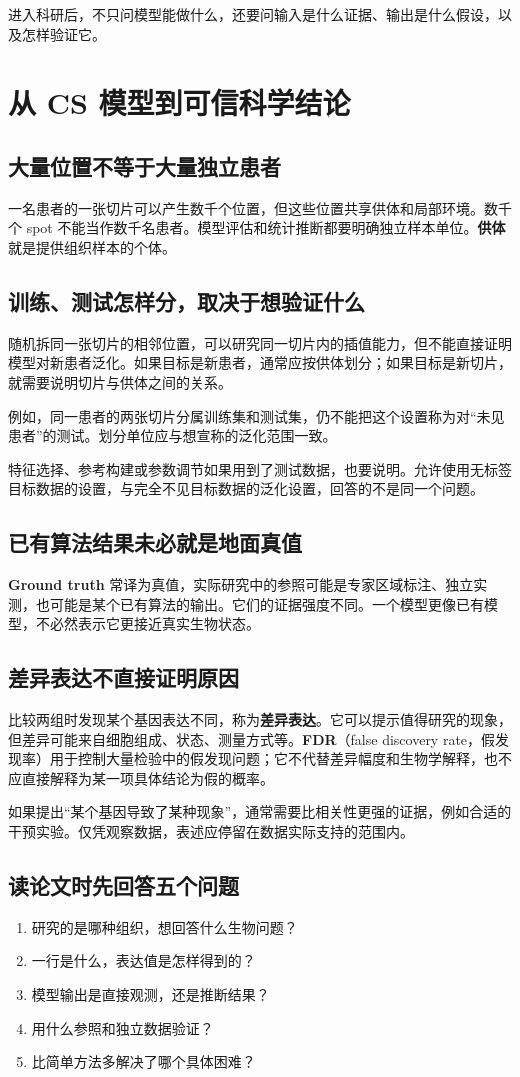 \documentclass[UTF8,a4paper,11pt,fontset=fandol]{ctexart}
\newcommand{\takeaway}[1]{\begin{tcolorbox}[learningstyle,title=本章要记住]#1\end{tcolorbox}}
\newcommand{\chapterstart}[1]{\clearpage\section{#1}}
\begin{document}
\takeaway{进入科研后，不只问模型能做什么，还要问输入是什么证据、输出是什么假设，以及怎样验证它。}

\chapterstart{从 CS 模型到可信科学结论}
\subsection{大量位置不等于大量独立患者}
一名患者的一张切片可以产生数千个位置，但这些位置共享供体和局部环境。数千个 spot 不能当作数千名患者。模型评估和统计推断都要明确独立样本单位。\textbf{供体}就是提供组织样本的个体。

\subsection{训练、测试怎样分，取决于想验证什么}
随机拆同一张切片的相邻位置，可以研究同一切片内的插值能力，但不能直接证明模型对新患者泛化。如果目标是新患者，通常应按供体划分；如果目标是新切片，就需要说明切片与供体之间的关系。

例如，同一患者的两张切片分属训练集和测试集，仍不能把这个设置称为对“未见患者”的测试。划分单位应与想宣称的泛化范围一致。

特征选择、参考构建或参数调节如果用到了测试数据，也要说明。允许使用无标签目标数据的设置，与完全不见目标数据的泛化设置，回答的不是同一个问题。

\subsection{已有算法结果未必就是地面真值}
\textbf{Ground truth} 常译为真值，实际研究中的参照可能是专家区域标注、独立实测，也可能是某个已有算法的输出。它们的证据强度不同。一个模型更像已有模型，不必然表示它更接近真实生物状态。

\subsection{差异表达不直接证明原因}
比较两组时发现某个基因表达不同，称为\textbf{差异表达}。它可以提示值得研究的现象，但差异可能来自细胞组成、状态、测量方式等。\textbf{FDR}（false discovery rate，假发现率）用于控制大量检验中的假发现问题；它不代替差异幅度和生物学解释，也不应直接解释为某一项具体结论为假的概率。

如果提出“某个基因导致了某种现象”，通常需要比相关性更强的证据，例如合适的干预实验。仅凭观察数据，表述应停留在数据实际支持的范围内。

\subsection{读论文时先回答五个问题}
\begin{enumerate}
  \item 研究的是哪种组织，想回答什么生物问题？
  \item 一行是什么，表达值是怎样得到的？
  \item 模型输出是直接观测，还是推断结果？
  \item 用什么参照和独立数据验证？
  \item 比简单方法多解决了哪个具体困难？
\end{enumerate}
\end{document}
